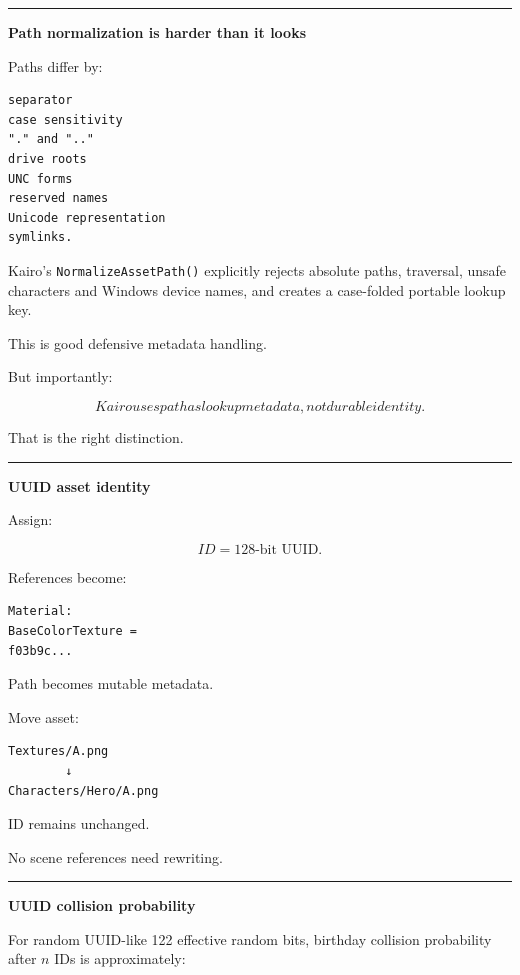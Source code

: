 \begin{center}\rule{0.5\linewidth}{0.5pt}\end{center}

\textbf{Path normalization is harder than it looks}

Paths differ by:

\begin{verbatim}
separator
case sensitivity
"." and ".."
drive roots
UNC forms
reserved names
Unicode representation
symlinks.
\end{verbatim}

Kairo's \texttt{NormalizeAssetPath()} explicitly rejects absolute paths, traversal, unsafe characters and Windows device names, and creates a case-folded portable lookup key.

This is good defensive metadata handling.

But importantly:

\[
\boxed{
Kairo uses path as lookup metadata,
not durable identity.
}
\]

That is the right distinction.

\begin{center}\rule{0.5\linewidth}{0.5pt}\end{center}

\textbf{UUID asset identity}

Assign:

\[
ID=
128\text{-bit UUID}.
\]

References become:

\begin{verbatim}
Material:
BaseColorTexture =
f03b9c...
\end{verbatim}

Path becomes mutable metadata.

Move asset:

\begin{verbatim}
Textures/A.png
        ↓
Characters/Hero/A.png
\end{verbatim}

ID remains unchanged.

No scene references need rewriting.

\begin{center}\rule{0.5\linewidth}{0.5pt}\end{center}

\textbf{UUID collision probability}

For random UUID-like 122 effective random bits, birthday collision probability after \(n\) IDs is approximately:

